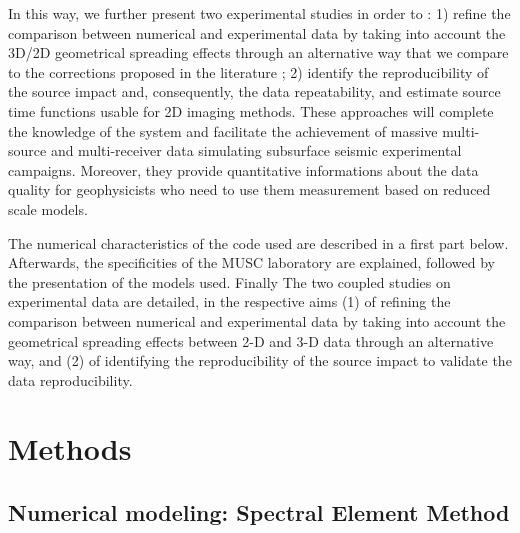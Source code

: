 \documentclass[manuscript,revised]{geophysics}
\newcommand{\twod}{2-D }
\newcommand{\thrd}{3-D }
\begin{document}

\noindent In this way, we further present two experimental studies in order to : 1) refine  the comparison between numerical and experimental data by taking into account the 3D/2D geometrical spreading effects through an alternative way that we compare to the corrections proposed in the literature ; 2) identify the reproducibility of the source impact and, consequently, the data repeatability, and estimate source time functions usable for 2D imaging methods. These approaches will complete the knowledge of the system and facilitate the achievement of massive multi-source and multi-receiver data simulating subsurface seismic experimental campaigns. Moreover, they provide quantitative informations about the data quality for geophysicists who need to use them measurement based on reduced scale models. 



\noindent The numerical characteristics of the code used are described in a first part below. Afterwards, the specificities of the MUSC laboratory are explained, followed by the presentation of the models used. Finally The two coupled studies on experimental data are detailed, in the respective aims (1) of refining the comparison between numerical and experimental data by taking into account the geometrical spreading effects between \twod and \thrd data through an alternative way, and (2) of identifying the reproducibility of the source impact to validate the data reproducibility.


\section{Methods}

\subsection{Numerical modeling: Spectral Element Method}
\end{document}
